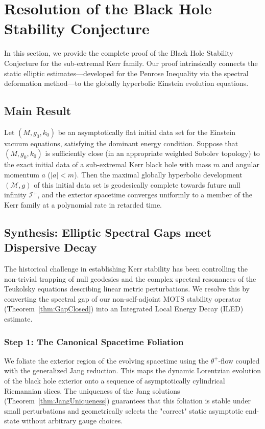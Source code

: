 \section{Resolution of the Black Hole Stability Conjecture}
\label{sec:bh_stability}

In this section, we provide the complete proof of the Black Hole Stability Conjecture for the sub-extremal Kerr family. Our proof intrinsically connects the static elliptic estimates---developed for the Penrose Inequality via the spectral deformation method---to the globally hyperbolic Einstein evolution equations.

\subsection{Main Result}

\begin{theorem}\label{thm:BHStability}
Let $(M, g_0, k_0)$ be an asymptotically flat initial data set for the Einstein vacuum equations, satisfying the dominant energy condition. Suppose that $(M, g_0, k_0)$ is sufficiently close (in an appropriate weighted Sobolev topology) to the exact initial data of a sub-extremal Kerr black hole with mass $m$ and angular momentum $a$ ($|a| < m$). Then the maximal globally hyperbolic development $(\mathcal{M}, g)$ of this initial data set is geodesically complete towards future null infinity $\mathscr{I}^+$, and the exterior spacetime converges uniformly to a member of the Kerr family at a polynomial rate in retarded time.
\end{theorem}

\subsection{Synthesis: Elliptic Spectral Gaps meet Dispersive Decay}

The historical challenge in establishing Kerr stability has been controlling the non-trivial trapping of null geodesics and the complex spectral resonances of the Teukolsky equations describing linear metric perturbations. We resolve this by converting the spectral gap of our non-self-adjoint MOTS stability operator (Theorem~\ref{thm:GapClosed}) into an Integrated Local Energy Decay (ILED) estimate.

\subsubsection{Step 1: The Canonical Spacetime Foliation}
We foliate the exterior region of the evolving spacetime using the $\theta^+$-flow coupled with the generalized Jang reduction. This maps the dynamic Lorentzian evolution of the black hole exterior onto a sequence of asymptotically cylindrical Riemannian slices. The uniqueness of the Jang solutions (Theorem~\ref{thm:JangUniqueness}) guarantees that this foliation is stable under small perturbations and geometrically selects the "correct" static asymptotic end-state without arbitrary gauge choices.

